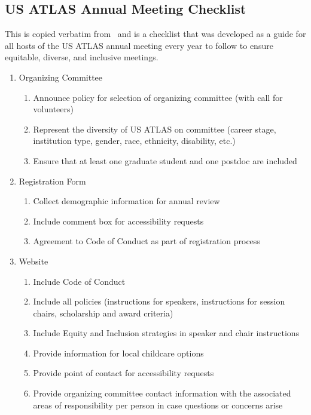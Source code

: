 \documentclass{article}
\begin{document}
  \subsection{US ATLAS Annual Meeting Checklist}

  This is copied verbatim from~\cite{USATLASChecklist} and is a checklist that was developed as a guide for all hosts of the US ATLAS annual meeting every year to follow to ensure equitable, diverse, and inclusive meetings.

  \begin{enumerate}
    \item Organizing Committee
    \begin{enumerate}[label=\alph*.]
      \item Announce policy for selection of organizing committee (with call for volunteers)
      \item Represent the diversity of US ATLAS on committee (career stage, institution type, gender, race, ethnicity, disability, etc.)
      \item Ensure that at least one graduate student and one postdoc are included
    \end{enumerate}
    \item Registration Form
    \begin{enumerate}[label=\alph*.]
      \item Collect demographic information for annual review
      \item Include comment box for accessibility requests
      \item Agreement to Code of Conduct as part of registration process
    \end{enumerate}
    \item Website
    \begin{enumerate}[label=\alph*.]
      \item Include Code of Conduct
      \item Include all policies (instructions for speakers, instructions for session chairs, scholarship and award criteria)
      \item Include Equity and Inclusion strategies in speaker and chair instructions
      \item Provide information for local childcare options
      \item Provide point of contact for accessibility requests
      \item Provide organizing committee contact information with the associated areas of responsibility per person in case questions or concerns arise

\end{enumerate}
\end{enumerate}
\end{document}
